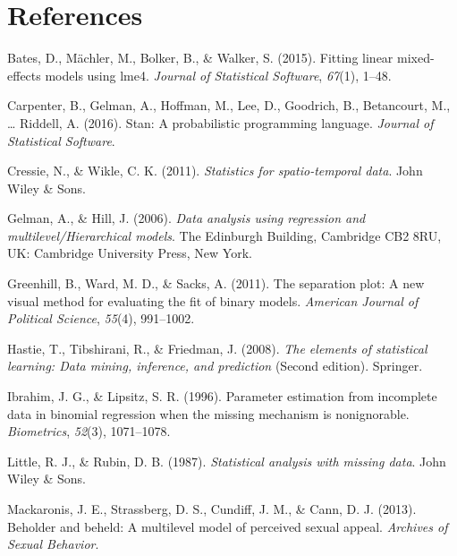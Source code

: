 \documentclass[12pt,twoside]{reedthesis}
\begin{document}
  \backmatter
  
  \chapter{References}\label{references}
  
  \noindent
  
  \setlength{\parindent}{-0.20in} \setlength{\leftskip}{0.20in}
  \setlength{\parskip}{8pt}
  
  \hypertarget{refs}{}
  \hypertarget{ref-lme4}{}
  Bates, D., Mächler, M., Bolker, B., \& Walker, S. (2015). Fitting linear
  mixed-effects models using lme4. \emph{Journal of Statistical Software},
  \emph{67}(1), 1--48.
  
  \hypertarget{ref-stan}{}
  Carpenter, B., Gelman, A., Hoffman, M., Lee, D., Goodrich, B.,
  Betancourt, M., \ldots{} Riddell, A. (2016). Stan: A probabilistic
  programming language. \emph{Journal of Statistical Software}.
  
  \hypertarget{ref-cressie2011}{}
  Cressie, N., \& Wikle, C. K. (2011). \emph{Statistics for
  spatio-temporal data}. John Wiley \& Sons.
  
  \hypertarget{ref-gelman}{}
  Gelman, A., \& Hill, J. (2006). \emph{Data analysis using regression and
  multilevel/Hierarchical models}. The Edinburgh Building, Cambridge CB2
  8RU, UK: Cambridge University Press, New York.
  
  \hypertarget{ref-greenhill2011}{}
  Greenhill, B., Ward, M. D., \& Sacks, A. (2011). The separation plot: A
  new visual method for evaluating the fit of binary models.
  \emph{American Journal of Political Science}, \emph{55}(4), 991--1002.
  
  \hypertarget{ref-esl}{}
  Hastie, T., Tibshirani, R., \& Friedman, J. (2008). \emph{The elements
  of statistical learning: Data mining, inference, and prediction} (Second
  edition). Springer.
  
  \hypertarget{ref-ibrahim1996}{}
  Ibrahim, J. G., \& Lipsitz, S. R. (1996). Parameter estimation from
  incomplete data in binomial regression when the missing mechanism is
  nonignorable. \emph{Biometrics}, \emph{52}(3), 1071--1078.
  
  \hypertarget{ref-little1987}{}
  Little, R. J., \& Rubin, D. B. (1987). \emph{Statistical analysis with
  missing data}. John Wiley \& Sons.
  
  \hypertarget{ref-mackaronis2013}{}
  Mackaronis, J. E., Strassberg, D. S., Cundiff, J. M., \& Cann, D. J.
  (2013). Beholder and beheld: A multilevel model of perceived sexual
  appeal. \emph{Archives of Sexual Behavior}.
  
\end{document}
